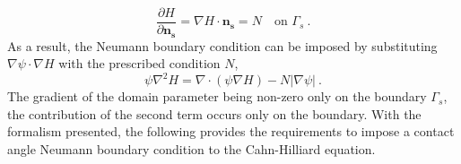     \begin{equation}
        \frac{\partial H}{\partial \mathbf{n_s}} = \nabla H \cdot \mathbf{n_s} = N \quad \text{on } \Gamma_s\ .
    \end{equation} 
    As a result, the Neumann boundary condition can be imposed by substituting $\nabla \psi \cdot \nabla H$ with the prescribed condition $N$,
    \begin{equation}
        \psi \nabla^2 H = \nabla \cdot (\psi \nabla H) - N|\nabla \psi|\ .
    \end{equation}
    The gradient of the domain parameter being non-zero only on the boundary $\Gamma_s$, the contribution of the second term occurs only on the boundary. With the formalism presented, the following provides the requirements to impose a contact angle Neumann boundary condition to the Cahn-Hilliard equation.
